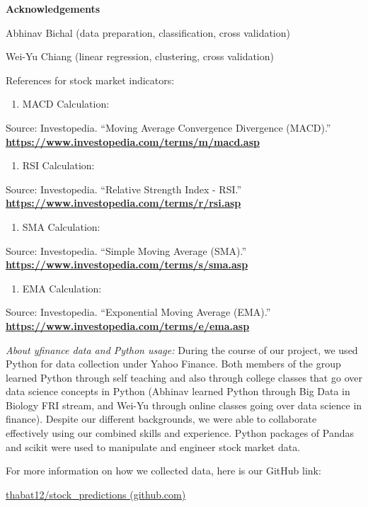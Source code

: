\documentclass[
]{article}
\providecommand{\tightlist}{%
  \setlength{\itemsep}{0pt}\setlength{\parskip}{0pt}}
\begin{document}
\textbf{Acknowledgements}

Abhinav Bichal (data preparation, classification, cross validation)

Wei-Yu Chiang (linear regression, clustering, cross validation)

References for stock market indicators:

\begin{enumerate}
\def\labelenumi{\arabic{enumi}.}
\tightlist
\item
  MACD Calculation:
\end{enumerate}

Source: Investopedia. ``Moving Average Convergence Divergence (MACD).''
\href{https://www.investopedia.com/terms/m/macd.asp}{\textbf{https://www.investopedia.com/terms/m/macd.asp}}

\begin{enumerate}
\def\labelenumi{\arabic{enumi}.}
\setcounter{enumi}{1}
\tightlist
\item
  RSI Calculation:
\end{enumerate}

Source: Investopedia. ``Relative Strength Index - RSI.''
\href{https://www.investopedia.com/terms/r/rsi.asp}{\textbf{https://www.investopedia.com/terms/r/rsi.asp}}

\begin{enumerate}
\def\labelenumi{\arabic{enumi}.}
\setcounter{enumi}{2}
\tightlist
\item
  SMA Calculation:
\end{enumerate}

Source: Investopedia. ``Simple Moving Average (SMA).''
\href{https://www.investopedia.com/terms/s/sma.asp}{\textbf{https://www.investopedia.com/terms/s/sma.asp}}

\begin{enumerate}
\def\labelenumi{\arabic{enumi}.}
\setcounter{enumi}{3}
\tightlist
\item
  EMA Calculation:
\end{enumerate}

Source: Investopedia. ``Exponential Moving Average (EMA).''
\href{https://www.investopedia.com/terms/e/ema.asp}{\textbf{https://www.investopedia.com/terms/e/ema.asp}}

\emph{About yfinance data and Python usage:} During the course of our
project, we used Python for data collection under Yahoo Finance. Both
members of the group learned Python through self teaching and also
through college classes that go over data science concepts in Python
(Abhinav learned Python through Big Data in Biology FRI stream, and
Wei-Yu through online classes going over data science in finance).
Despite our different backgrounds, we were able to collaborate
effectively using our combined skills and experience. Python packages of
Pandas and scikit were used to manipulate and engineer stock market
data.

For more information on how we collected data, here is our GitHub link:

\href{https://github.com/thabat12/stock_predictions/tree/master}{thabat12/stock\_predictions
(github.com)}
\end{document}
